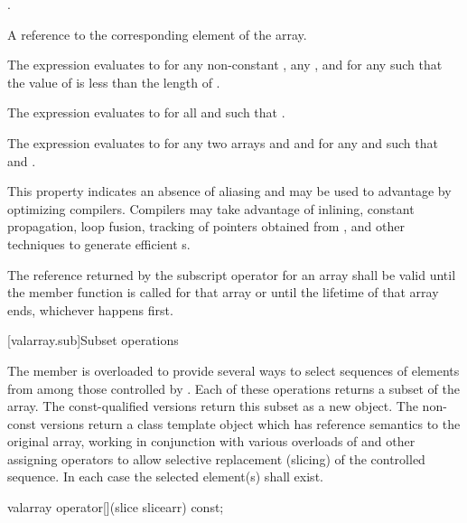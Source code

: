 \begin{itemdescr}
\pnum
\requires
{}.

\pnum
\returns
A reference to the corresponding element of the array.
\begin{note}
The expression 
evaluates to  for any non-constant ,
any , and for any 
such that the value of  is less than the length of .
\end{note}

\pnum
\remarks
The expression 
evaluates to  for all  and 
such that .

\pnum
The expression 
evaluates to  for any two arrays
 and  and for any
 and 
such that 
and .
\begin{note} This property indicates an absence of aliasing and may be used to
advantage by optimizing compilers. Compilers may take advantage
of inlining, constant propagation, loop fusion,
tracking of pointers obtained from
,
and other techniques to generate efficient
s.
\end{note}

\pnum
The reference returned by the subscript operator for an array shall
be valid until the member function
 is called for that array or until the lifetime of
that array ends, whichever happens first.
\end{itemdescr}

[valarray.sub]{Subset operations}

%
\pnum
The member  is overloaded to provide several ways to select
sequences of elements from among those controlled by . Each of these
operations returns a subset of the array. The const-qualified versions return this
subset as a new  object. The non-const versions return a class
template object which has reference semantics to the original array, working in
conjunction with various overloads of  and other assigning
operators to allow selective replacement (slicing) of the controlled sequence.
In each case the selected element(s) shall exist.

%
\begin{itemdecl}
valarray operator[](slice slicearr) const;
\end{itemdecl}

